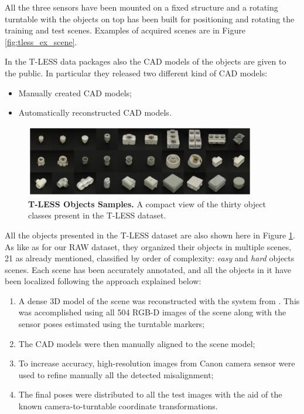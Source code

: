 All the three sensors have been mounted on a fixed structure and a rotating turntable with the objects on top has been built for positioning and rotating the training and test scenes. Examples of acquired scenes are in Figure \ref{fig:tless_ex_scene}.

In the T-LESS data packages also the CAD models of the objects are given to the public. In particular they released two different kind of CAD models:

\begin{itemize}
	\item Manually created CAD models;
	\item Automatically reconstructed CAD models.
\end{itemize}


\begin{figure}
    \centering
    \includegraphics[width=0.9\textwidth]{figures/2_benchmarks_and_metrics/tless_objs_ex}
    \caption{\textbf{T-LESS Objects Samples.} A compact view of the thirty object classes present in the T-LESS dataset.}
    \label{fig:tless_objs_ex}
\end{figure}

All the objects presented in the T-LESS dataset are also shown here in Figure \ref{fig:tless_objs_ex}. As like as for our RAW dataset, they organized their objects in multiple scenes, 21 as already mentioned, classified by order of complexity: \emph{easy} and \emph{hard} objects scenes. Each scene has been accurately annotated, and all the objects in it have been localized following the approach explained below:

\begin{enumerate}
	\item A dense 3D model of the scene was reconstructed with the system from \cite{steinbrucker2014volumetric}. This was accomplished using all 504 RGB-D images of the scene along with the sensor poses estimated using the turntable markers;
	\item The CAD models were then manually aligned to the scene model;
	\item To increase accuracy, high-resolution images from Canon camera sensor were used to refine manually all the detected misalignment;
	\item The final poses were distributed to all the test images with the aid of the known camera-to-turntable coordinate transformations.
\end{enumerate}

